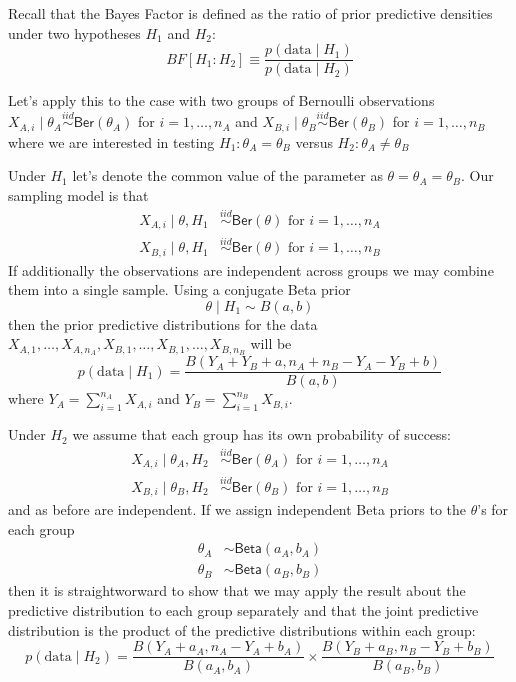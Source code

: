 \documentclass[11pt]{article}
\def\Ber{\textsf{Ber}}
\def\iid{\stackrel{iid}{\sim}}
\newcommand{\Beta}{\textsf{Beta}}
\def\BF{\textit{BF}}
\def\data{\text{data}}
\begin{document}
Recall that the Bayes Factor is defined as the ratio of prior predictive densities under two hypotheses $H_1$ and $H_2$:
$$
\BF[H_1:H_2] \equiv \frac{p(\data \mid H_1)}{ p(\data \mid H_2)}
$$

Let's apply this to the case with two groups of Bernoulli observations $X_{A,i} \mid \theta_A \iid \Ber(\theta_A)$ for $i = 1, \ldots, n_A$ and $X_{B,i} \mid \theta_B \iid \Ber(\theta_B)$ for $i = 1, \ldots, n_B$  where we are interested in testing $H_1: \theta_A = \theta_B$ versus $H_2: \theta_A \neq \theta_B$ 

Under $H_1$ let's denote the common value of the parameter as $\theta = \theta_A = \theta_B$.  Our sampling model is that 
 \begin{align*}
X_{A,i} \mid \theta, H_1 & \iid \Ber(\theta) \text{ for }i = 1, \ldots, n_A \\
X_{B,i} \mid \theta, H_1 & \iid \Ber(\theta)  \text{ for } i = 1, \ldots, n_B  
\end{align*}
If additionally the observations are independent across groups we may combine them into a single sample. Using a conjugate Beta prior 
$$\theta \mid H_1 \sim B(a, b)$$
then the prior predictive distributions for the data $X_{A,1}, \ldots, X_{A, n_A}, X_{B,1}, \ldots, X_{B, 1}, \ldots, X_{B, n_B}$ will be
$$p(\data \mid H_1) = \frac{B(Y_A + Y_B + a, n_A + n_B - Y_A - Y_B + b)}{B(a,b)}
$$
where $Y_A = \sum_{i = 1}^{n_A} X_{A,i}$ and $Y_B = \sum_{i = 1}^{n_B}X_{B, i}$.

Under $H_2$ we assume that each group has its own probability of success:
\begin{align*}
X_{A,i}  \mid \theta_A, H_2 & \iid \Ber(\theta_A) \text{ for }i = 1, \ldots, n_A \\
X_{B,i}  \mid \theta_B, H_2 & \iid \Ber(\theta_B)  \text{ for } i = 1, \ldots, n_B  
\end{align*}
and as before are independent.  If we assign independent Beta priors to the $\theta$'s  for each group
\begin{align*}
\theta_A & \sim \Beta(a_A, b_A) \\
\theta_B & \sim \Beta(a_B, b_B)
\end{align*}
then it is straightworward to show that we may apply the result about the predictive distribution to each group separately and that the joint predictive distribution is the product of the predictive distributions within each group:
$$p(\data \mid H_2) = \frac{B(Y_A + a_A, n_A - Y_A  + b_A)} {B(a_A,b_A)}\times 
\frac{B(Y_B + a_B, n_B - Y_B  + b_B)} {B(a_B,b_B)}
$$
\end{document}
